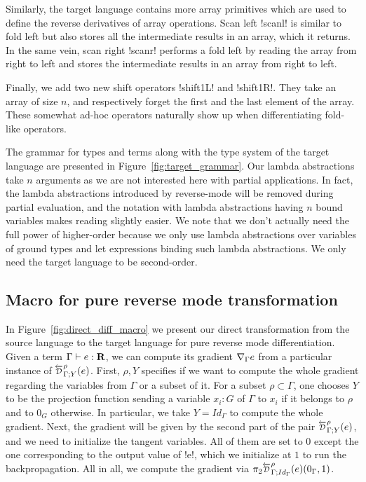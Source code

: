 Similarly, the target language contains more array primitives which are used to define the reverse derivatives of array operations. 
Scan left !scanl! is similar to fold left but also stores all the intermediate results in an array, which it returns.
In the same vein, scan right !scanr! performs a fold left by reading the array from right to left and stores 
the intermediate results in an array from right to left.

Finally, we add two new shift operators !shift1L! and !shift1R!. 
They take an array of size $n$, and respectively forget the first and the last element of the array.
These somewhat ad-hoc operators naturally show up when differentiating fold-like operators.

The grammar for types and terms along with the type system of the target language are presented in Figure~\ref{fig:target_grammar}.
Our lambda abstractions take $n$ arguments as we are not interested here with partial applications. 
In fact, the lambda abstractions introduced by reverse-mode will be removed during partial evaluation, 
and the notation with lambda abstractions having $n$ bound variables makes reading slightly easier.
We note that we don't actually need the full power of higher-order because we only use lambda abstractions over variables of ground types
and let expressions binding such lambda abstractions. We only need the target language to be second-order.



\subsection{Macro for pure reverse mode transformation} %
\label{sub:Macro for pure reverse mode transformation}

In Figure~\ref{fig:direct_diff_macro} we present our direct transformation from the source language to the target language for pure reverse mode differentiation.
Given a term $\Gamma\vdash e : \mathbf{R}$, we can compute its gradient $\nabla_\Gamma e$ from a particular instance of 
$\directD{\rho}{\Gamma}{Y}(e)$. First, $\rho, Y$ specifies if we want to compute the whole gradient regarding the variables from $\Gamma$ or a subset of it.
For a subset $\rho\subset \Gamma$, one chooses $Y$ to be the projection function sending a variable 
$x_i:G$ of $\Gamma$ to $x_i$ if it belongs to $\rho$ and to $0_G$ otherwise.
In particular, we take $Y=Id_\Gamma$ to compute the whole gradient.
Next, the gradient will be given by the second part of the pair $\directD{\rho}{\Gamma}{Y}(e)$, 
and we need to initialize the tangent variables. All of them are set to $0$ except the one corresponding to the output value of !e!, 
which we initialize at $1$ to run the backpropagation. 
All in all, we compute the gradient via $\pi_2\directD{\rho}{\Gamma}{Id_\Gamma}(e)(0_\Gamma,1)$.

